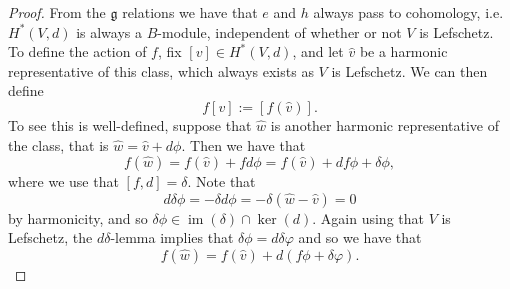 \documentclass{amsart}
\theoremstyle{definition}
\DeclareMathOperator{\im}{im}
\begin{document}
\begin{proof}
    From the $\mathfrak{g}$ relations we have that $e$ and $h$ always pass to cohomology, i.e. $H^*(V,d)$ is always a $B$-module, independent of whether or not $V$ is Lefschetz. To define the action of $f$, fix $[v] \in H^*(V,d)$, and let $\hat{v}$ be a harmonic representative of this class, which always exists as $V$ is Lefschetz. We can then define
    \begin{equation*}
        f[v] := [f(\hat{v})].
    \end{equation*}
    To see this is well-defined, suppose that $\hat{w}$ is another harmonic representative of the class, that is $\hat{w}=\hat{v}+d\phi$. Then we have that
    \begin{equation*}
        f(\hat{w}) = f(\hat{v}) + fd\phi = f(\hat{v}) + df\phi + \delta \phi,
    \end{equation*}
    where we use that $[f,d]=\delta$. Note that
    \begin{equation*}
        d\delta \phi = -\delta d \phi = -\delta ( \hat{w}-\hat{v})=0
    \end{equation*}
    by harmonicity, and so $ \delta \phi \in \im(\delta) \cap \ker(d)$. Again using that $V$ is Lefschetz, the $d\delta$-lemma implies that $\delta \phi = d\delta \varphi$ and so we have that
    \begin{equation*}
        f(\hat{w}) = f(\hat{v}) + d(f\phi + \delta \varphi).
    \end{equation*}
\end{proof}
\end{document}
